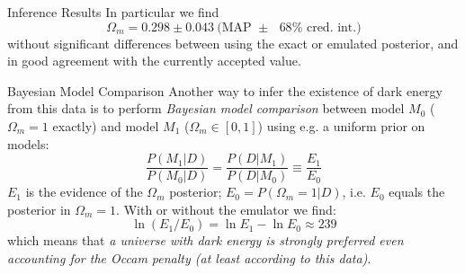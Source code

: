 \documentclass[aspectratio=43,xcolor=svgnames]{beamer} %
\begin{document}
\begin{frame}{Inference Results}
{In particular we find
\begin{equation*}
    \Omega_m = 0.298\pm 0.043 \ \text{(MAP $\pm$ $68\%$ cred. int.)}
\end{equation*}
without significant differences between using the exact or emulated posterior, and in good agreement with the currently accepted value.
}
\end{frame}

\begin{frame}{Bayesian Model Comparison}
Another way to infer the existence of dark energy from this data is to perform \emph{Bayesian model comparison} between model $M_0$ ($\Omega_m=1$ exactly) and model $M_1$ ($\Omega_m \in [0, 1]$) using e.g. a uniform prior on models:
\pause
\begin{equation*}
    \frac{P(M_1|D)}{P(M_0|D)} = \frac{P(D|M_1)}{P(D|M_0)} \equiv\frac{E_1}{E_0}
\end{equation*}
\pause
$E_1$ is the evidence of the $\Omega_m$ posterior; $E_0=P(\Omega_m=1|D)$, i.e. $E_0$ equals the posterior in $\Omega_m=1$.
\pause
With or without the emulator we find:
\begin{equation*}
    \ln(E_1/E_0) = \ln E_1 - \ln E_0 \approx 239
\end{equation*}
which means that \emph{a universe with dark energy is strongly preferred even accounting for the Occam penalty (at least according to this data)}.
\end{frame}
\end{document}
